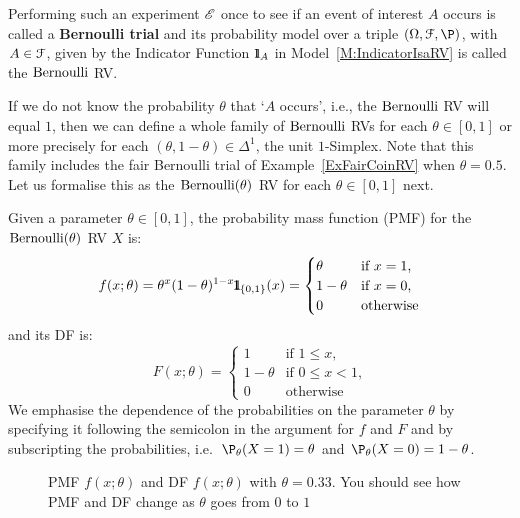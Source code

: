 Performing such an experiment $\mathscr{E}$ once to see if an event of interest $A$ occurs is called a {\bf Bernoulli trial} and its probability model over a triple $(\Omega,\C{F},\P)$, with $A \in \mathcal{F}$, given by  the Indicator Function ${1}\mspace{-11 mu}{1}_A$ in Model~\ref{M:IndicatorIsaRV} is called the $\mbox{{\rm Bernoulli}}$ RV. 

If we do not know the probability $\theta$ that `$A$ occurs', i.e., the $\mbox{{\rm Bernoulli}}$ RV will equal $1$, then we can define a whole family of $\mbox{{\rm Bernoulli}}$ RVs for each 
$\theta \in [0,1]$ or more precisely for each $(\theta, 1-\theta) \in \Delta^1$, the unit $1$-Simplex.
Note that this family includes the fair Bernoulli trial of Example~\ref{ExFairCoinRV} when $\theta=0.5$. Let us formalise this as the $\mbox{{\rm Bernoulli}}(\theta)$ RV for each $\theta \in [0,1]$ next.

\begin{model}
Given a parameter $\theta \in [0,1]$, the probability mass function (PMF) for the $\mbox{{\rm Bernoulli}}(\theta)$ RV $X$ is:
\begin{equation}\label{E:Bernoullipdf}
f(x;\theta)= \theta^x (1-\theta)^{1-x} {1}\mspace{-11 mu}{1}_{\{0,1\}}(x) =
\begin{cases}
\theta & \text{if $x=1$,}\\
1-\theta & \text{if $x=0$,}\\
0 & \text{otherwise}
\end{cases}
\end{equation}
and its DF is:
\begin{equation}
F(x;\theta) =
\begin{cases}
1 & \text{if $1 \leq x$,}\\
1-\theta & \text{if $0 \leq x < 1$,}\\
0 & \text{otherwise}
\end{cases}
\end{equation}
We emphasise the dependence of the probabilities on the parameter $\theta$ by specifying it following the semicolon in the argument for $f$ and $F$ and by subscripting the probabilities, i.e.~$\P_{\theta}(X=1)=\theta$ and $\P_{\theta}(X=0)=1-\theta$.
\end{model}
\begin{figure}[htpb]
\centering   {}
\caption{PMF $f(x;\theta)$ and DF $f(x;\theta)$ with $\theta = 0.33$. You should see how PMF and DF change as $\theta$ goes from $0$ to $1$}
\end{figure}

